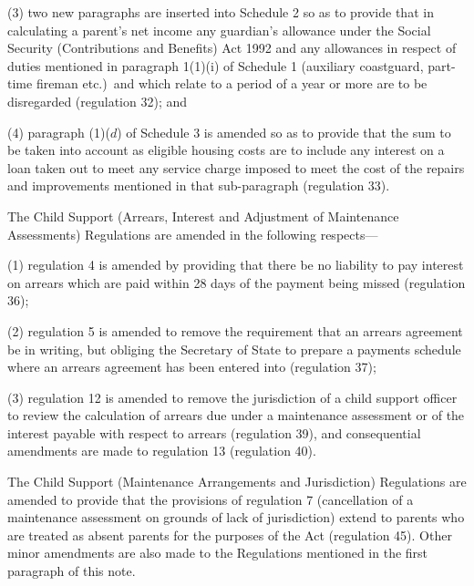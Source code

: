 \documentclass[12pt,a4paper]{article}
\begin{document}
 (3) two new paragraphs are inserted into Schedule 2 so as to provide that in calculating a parent’s net income any guardian’s allowance under the Social Security (Contributions and Benefits) Act 1992 and any allowances in respect of duties mentioned in paragraph 1(1)(i) of Schedule 1 (auxiliary coastguard, part-time fireman etc.)\ and which relate to a period of a year or more are to be disregarded (regulation 32); and

 (4) paragraph (1)($d$) of Schedule 3 is amended so as to provide that the sum to be taken into account as eligible housing costs are to include any interest on a loan taken out to meet any service charge imposed to meet the cost of the repairs and improvements mentioned in that sub-paragraph (regulation 33).

 The Child Support (Arrears, Interest and Adjustment of Maintenance Assessments) Regulations are amended in the following respects---

 (1) regulation 4 is amended by providing that there be no liability to pay interest on arrears which are paid within 28 days of the payment being missed (regulation 36);

 (2) regulation 5 is amended to remove the requirement that an arrears agreement be in writing, but obliging the Secretary of State to prepare a payments schedule where an arrears agreement has been entered into (regulation 37);

 (3) regulation 12 is amended to remove the jurisdiction of a child support officer to review the calculation of arrears due under a maintenance assessment or of the interest payable with respect to arrears (regulation 39), and consequential amendments are made to regulation 13 (regulation 40).

  The Child Support (Maintenance Arrangements and Jurisdiction) Regulations are amended to provide that the provisions of regulation 7 (cancellation of a maintenance assessment on grounds of lack of jurisdiction) extend to parents who are treated as absent parents for the purposes of the Act (regulation 45). Other minor amendments are also made to the Regulations mentioned in the first paragraph of this note.
\end{document}

